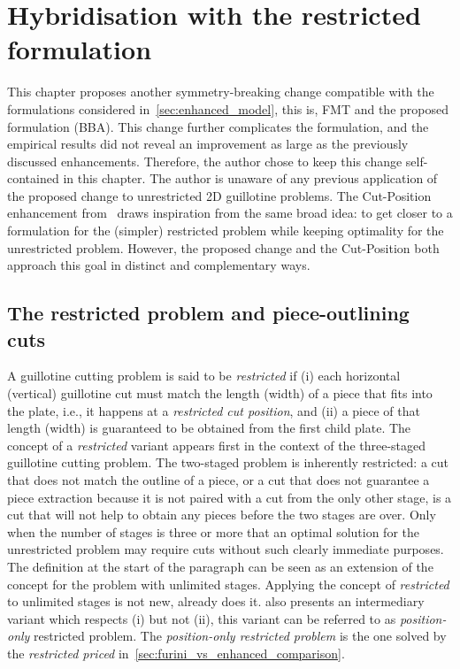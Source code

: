 \documentclass[ppgc,tese,english,formais,babel]{iiufrgs}
\begin{document}




\chapter{Hybridisation with the restricted formulation}
\label{sec:hybridisation}

This chapter proposes another symmetry-breaking change compatible with the formulations considered in~\cref{sec:enhanced_model}, this is, FMT and the proposed formulation (BBA).
This change further complicates the formulation, and the empirical results did not reveal an improvement as large as the previously discussed enhancements.
Therefore, the author chose to keep this change self-contained in this chapter.
The author is unaware of any previous application of the proposed change to unrestricted 2D guillotine problems.
The Cut-Position enhancement from~\citet{furini:2016} draws inspiration from the same broad idea: to get closer to a formulation for the (simpler) restricted problem while keeping optimality for the unrestricted problem.
However, the proposed change and the Cut-Position both approach this goal in distinct and complementary ways.

\section{The restricted problem and piece-outlining cuts}

A guillotine cutting problem is said to be \emph{restricted} if (i) each horizontal (vertical) guillotine cut must match the length (width) of a piece that fits into the plate, i.e., it happens at a \emph{restricted cut position}, and (ii) a piece of that length (width) is guaranteed to be obtained from the first child plate.
The concept of a \emph{restricted} variant appears first in the context of the three-staged guillotine cutting problem.
The two-staged problem is inherently restricted: a cut that does not match the outline of a piece, or a cut that does not guarantee a piece extraction because it is not paired with a cut from the only other stage, is a cut that will not help to obtain any pieces before the two stages are over.
Only when the number of stages is three or more that an optimal solution for the unrestricted problem may require cuts without such clearly immediate purposes.
The definition at the start of the paragraph can be seen as an extension of the concept for the problem with unlimited stages.
Applying the concept of \emph{restricted} to unlimited stages is not new, \citet{furini:2016} already does it. \citet{furini:2016} also presents an intermediary variant which respects (i) but not (ii), this variant can be referred to as \emph{position-only} restricted problem.
The \emph{position-only restricted problem} is the one solved by the \emph{restricted priced} in~\cref{sec:furini_vs_enhanced_comparison}.
\end{document}
